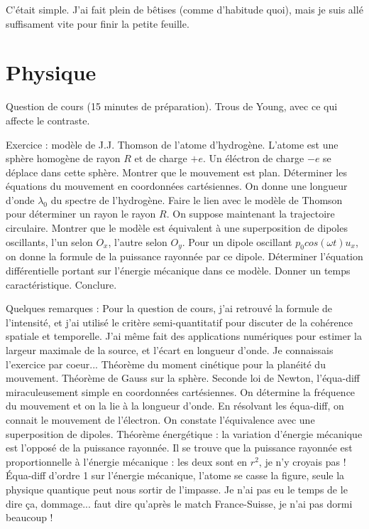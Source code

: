 \documentclass[french,a4paper, 12pt]{article}
\begin{document}
C'était simple. J'ai fait plein de bêtises (comme d'habitude quoi), mais je suis allé suffisament vite pour finir la petite feuille.

\section*{}

\section*{Physique}
Question de cours (15 minutes de préparation). Trous de Young, avec ce qui affecte le contraste.

Exercice : modèle de J.J. Thomson de l'atome d'hydrogène. L'atome est une sphère homogène de rayon $R$ et de charge $+e$. Un éléctron de charge $-e$ se déplace dans cette sphère. Montrer que le mouvement est plan. Déterminer les équations du mouvement en coordonnées cartésiennes. On donne une longueur d'onde $\lambda_0$ du spectre de l'hydrogène. Faire le lien avec le modèle de Thomson pour déterminer un rayon le rayon $R$. On suppose maintenant la trajectoire circulaire. Montrer que le modèle est équivalent à une superposition de dipoles oscillants, l'un selon $O_x$, l'autre selon $O_y$. Pour un dipole oscillant $p_0cos(\omega t)u_x$, on donne la formule de la puissance rayonnée par ce dipole. Déterminer l'équation différentielle portant sur l'énergie mécanique dans ce modèle. Donner un temps caractéristique. Conclure.


Quelques remarques : Pour la question de cours, j'ai retrouvé la formule de l'intensité, et j'ai utilisé le critère semi-quantitatif pour discuter de la cohérence spatiale et temporelle. J'ai même fait des applications numériques pour estimer la largeur maximale de la source, et l'écart en longueur d'onde. Je connaissais l'exercice par coeur... Théorème du moment cinétique pour la planéité du mouvement. Théorème de Gauss sur la sphère. Seconde loi de Newton, l'équa-diff miraculeusement simple en coordonnées cartésiennes. On détermine la fréquence du mouvement et on la lie à la longueur d'onde. En résolvant les équa-diff, on connait le mouvement de l'électron. On constate l'équivalence avec une superposition de dipoles. Théorème énergétique : la variation d'énergie mécanique est l'opposé de la puissance rayonnée. Il se trouve que la puissance rayonnée est proportionnelle à l'énergie mécanique : les deux sont en $r^2$, je n'y croyais pas ! Équa-diff d'ordre 1 sur l'énergie mécanique, l'atome se casse la figure, seule la physique quantique peut nous sortir de l'impasse. Je n'ai pas eu le temps de le dire ça, dommage... faut dire qu'après le match France-Suisse, je n'ai pas dormi beaucoup !
\end{document}
